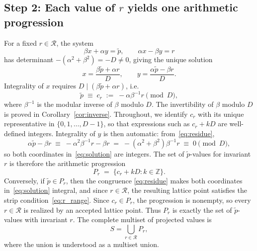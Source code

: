 \documentclass[11pt,reqno]{amsart}
\theoremstyle{plain}
\theoremstyle{definition}
\theoremstyle{remark}
\begin{document}
\subsection{\texorpdfstring{Step 2: Each value of \(r\) yields one arithmetic progression}{Step 2: Each value of r yields one arithmetic progression}}
\label{subsec:step2}

For a fixed \(r \in \mathcal{R}\), the system
\begin{equation}
    \beta x + \alpha y = \tilde{p}, \qquad
    \alpha x - \beta y = r
\end{equation}
has determinant \(-(\alpha^2+\beta^2) = -D \ne 0\), giving the unique solution
\begin{equation}\label{eq:solution}
    x = \frac{\beta\tilde{p} + \alpha r}{D}, \qquad
    y = \frac{\alpha\tilde{p} - \beta r}{D}.
\end{equation}
Integrality of \(x\) requires \(D \mid (\beta\tilde{p} + \alpha r)\), i.e.
\begin{equation}\label{eq:residue}
    \tilde{p} \;\equiv\; c_r \;:=\; -\alpha\beta^{-1}r \pmod{D},
\end{equation}
where \(\beta^{-1}\) is the modular inverse of \(\beta\) modulo \(D\).
The invertibility of \(\beta\) modulo \(D\) is proved in Corollary~\ref{cor:inverse}.
Throughout, we identify
\(c_r\) with its unique representative in \(\{0, 1, \ldots, D-1\}\),
so that expressions such as \(c_r + kD\) are well-defined integers.  Integrality of \(y\) is then
automatic: from~\eqref{eq:residue},
\[
    \alpha\tilde{p} - \beta r
    \;\equiv\;
    -\alpha^2\beta^{-1}r - \beta r
    \;=\;
    -(\alpha^2 + \beta^2)\beta^{-1}r
    \;\equiv\; 0 \pmod{D},
\]
so both coordinates in~\eqref{eq:solution} are integers.
The set of \(\tilde{p}\)-values for invariant~\(r\) is therefore the
arithmetic progression
\begin{equation}\label{eq:Pr}
    P_r \;=\; \{c_r + kD : k \in \mathbb{Z}\}.
\end{equation}
Conversely, if \(\tilde{p} \in P_r\), then the congruence
\eqref{eq:residue} makes both coordinates in~\eqref{eq:solution} integral,
and since \(r \in \mathcal{R}\), the resulting lattice point satisfies the
strip condition~\eqref{eq:r_range}.  Since \(c_r \in P_r\), the progression
is nonempty, so every \(r \in \mathcal{R}\) is realized by an accepted
lattice point.  Thus \(P_r\) is exactly the set of
\(\tilde{p}\)-values with invariant \(r\).  The complete multiset of
projected values is
\[
    S = \bigcup_{r \in \mathcal{R}} P_r,
\]
where the union is understood as a multiset union.
\end{document}
